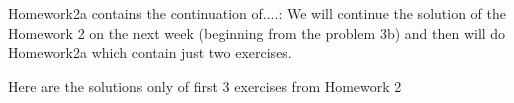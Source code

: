 
   Homework2a contains the continuation of....: 
    We will continue the solution of the Homework 2 on the next week
(beginning from the problem 3b) and then will do Homework2a
which contain just two exercises.
      
  Here are the solutions only of first 3 exercises from Homework 2

            \bye
